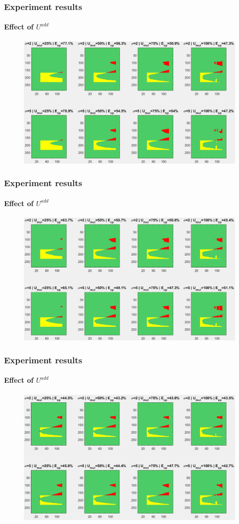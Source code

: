 \documentclass[fleqn]{beamer}
\begin{document}
\begin{frame}
	\frametitle{Experiment results}
	\framesubtitle{Effect of $U^{add}$}
	\begin{figure}
		\centering
		\includegraphics[width=4.5in]{figures/results_figures/Uadd/cp_Uadd_25_lambda_11.png}
	\end{figure}
\end{frame}

\begin{frame}
	\frametitle{Experiment results}
	\framesubtitle{Effect of $U^{add}$}
	\begin{figure}
		\centering
		\includegraphics[width=4.5in]{figures/results_figures/Uadd/cp_Uadd_5_lambda_11.png}
	\end{figure}
\end{frame}

\begin{frame}
	\frametitle{Experiment results}
	\framesubtitle{Effect of $U^{add}$}
	\begin{figure}
		\centering
		\includegraphics[width=4.5in]{figures/results_figures/Uadd/cp_Uadd_10_lambda_11.png}
	\end{figure}
\end{frame}
\end{document}

